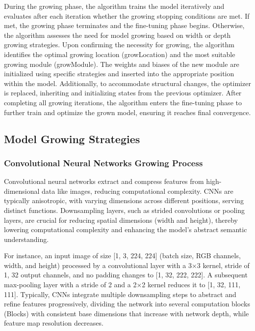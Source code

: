 \documentclass[preprint,12pt]{elsarticle}
\begin{document}
During the growing phase, the algorithm trains the model iteratively and evaluates after each iteration whether the growing stopping conditions are met. If met, the growing phase terminates and the fine-tuning phase begins. Otherwise, the algorithm assesses the need for model growing based on width or depth growing strategies. Upon confirming the necessity for growing, the algorithm identifies the optimal growing location (growLocation) and the most suitable growing module (growModule). The weights and biases of the new module are initialized using specific strategies and inserted into the appropriate position within the model. Additionally, to accommodate structural changes, the optimizer is replaced, inheriting and initializing states from the previous optimizer. After completing all growing iterations, the algorithm enters the fine-tuning phase to further train and optimize the grown model, ensuring it reaches final convergence.

\subsection{Model Growing Strategies}

\subsubsection{Convolutional Neural Networks Growing Process}

Convolutional neural networks extract and compress features from high-dimensional data like images, reducing computational complexity. CNNs are typically anisotropic, with varying dimensions across different positions, serving distinct functions. Downsampling layers, such as strided convolutions or pooling layers, are crucial for reducing spatial dimensions (width and height), thereby lowering computational complexity and enhancing the model's abstract semantic understanding.

For instance, an input image of size [1, 3, 224, 224] (batch size, RGB channels, width, and height) processed by a convolutional layer with a 3×3 kernel, stride of 1, 32 output channels, and no padding changes to [1, 32, 222, 222]. A subsequent max-pooling layer with a stride of 2 and a 2×2 kernel reduces it to [1, 32, 111, 111]. Typically, CNNs integrate multiple downsampling steps to abstract and refine features progressively, dividing the network into several computation blocks (Blocks) with consistent base dimensions that increase with network depth, while feature map resolution decreases.
\end{document}
